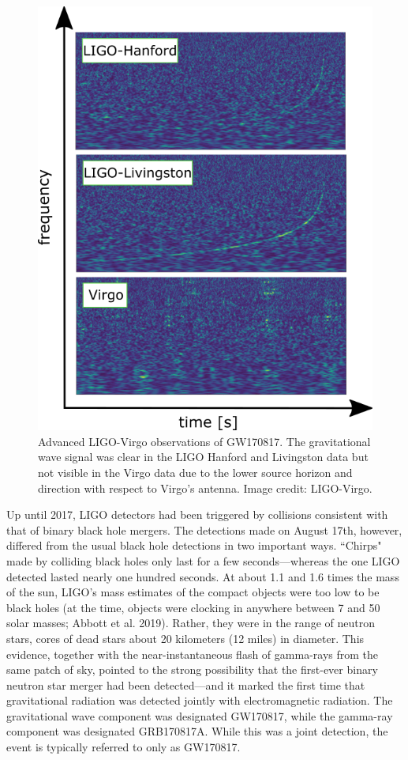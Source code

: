 \documentclass[1.5,11pt]{beavtex}
\begin{document}
\pagebreak[4]
\begin{figure}[h!]
  \centering
  \includegraphics[scale=0.50]{images/ch1/GW-observations.png}
  \caption{\selectfont   Advanced LIGO-Virgo observations of GW170817. The gravitational wave signal was clear in the LIGO Hanford and Livingston data but not visible in the Virgo data due to the lower source horizon and direction with respect to Virgo's antenna. Image credit: LIGO-Virgo.}
  \label{fig:LIGO-Virgo}
\end{figure}


Up until 2017, LIGO detectors had been triggered by collisions consistent with that of binary black hole mergers. The detections made on August 17th, however, differed from the usual black hole detections in two important ways. ``Chirps" made by colliding black holes only last for a few seconds---whereas the one LIGO detected lasted nearly one hundred seconds. At about 1.1 and 1.6 times the mass of the sun, LIGO's mass estimates of the compact objects were too low to be black holes (at the time, objects were clocking in anywhere between 7 and 50 solar masses; Abbott et al. 2019). Rather, they were in the range of neutron stars, cores of dead stars about 20 kilometers (12 miles) in diameter. This evidence, together with the near-instantaneous flash of gamma-rays from the same patch of sky, pointed to the strong possibility that the first-ever binary neutron star merger had been detected---and it marked the first time that gravitational radiation was detected jointly with electromagnetic radiation. The gravitational wave component was designated GW170817, while the gamma-ray component was designated GRB170817A. While this was a joint detection, the event is typically referred to only as GW170817. 
\end{document}
